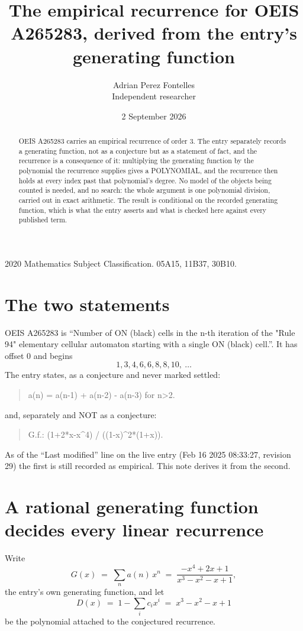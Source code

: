 \documentclass[11pt,a4paper]{article}
\title{The empirical recurrence for OEIS A265283, derived from the entry's generating function}
\author{Adrian Perez Fontelles\\ \small Independent researcher}
\date{2 September 2026}
\theoremstyle{plain}
\theoremstyle{definition}
\begin{document}
\maketitle

\begin{abstract}
OEIS A265283 carries an empirical recurrence of order $3$. The entry separately records a
generating function, not as a conjecture but as a statement of fact, and the recurrence is a
consequence of it: multiplying the generating function by the polynomial the recurrence
supplies gives a POLYNOMIAL, and the recurrence then holds at every index past that
polynomial's degree. No model of the objects being counted is needed, and no search: the
whole argument is one polynomial division, carried out in exact arithmetic. The result is
conditional on the recorded generating function, which is what the entry asserts and what is
checked here against every published term.
\end{abstract}

\noindent\small 2020 Mathematics Subject Classification. 05A15, 11B37, 30B10.\normalsize

\section{The two statements}

OEIS A265283 is ``Number of ON (black) cells in the n-th iteration of the "Rule 94" elementary cellular automaton starting with a single ON (black) cell.''. It has offset $0$ and begins
\[
1, 3, 4, 6, 6, 8, 8, 10,\ \dots
\]
The entry states, as a conjecture and never marked settled:
\begin{quote}
a(n) = a(n-1) + a(n-2) - a(n-3) for n>2.
\end{quote}
and, separately and NOT as a conjecture:
\begin{quote}
G.f.: (1+2*x-x\^{}4) / ((1-x)\^{}2*(1+x)).
\end{quote}
As of the ``Last modified'' line on the live entry (Feb 16 2025 08:33:27, revision 29) the first is still
recorded as empirical. This note derives it from the second.

\section{A rational generating function decides every linear recurrence}

Write
\[
G(x)\;=\;\sum_{n}a(n)\,x^{n}\;=\;\frac{- x^{4} + 2 x + 1}{x^{3} - x^{2} - x + 1},
\]
the entry's own generating function, and let
\[
D(x)\;=\;1-\sum_i c_i x^{i}\;=\;x^{3} - x^{2} - x + 1
\]
be the polynomial attached to the conjectured recurrence.
\end{document}
